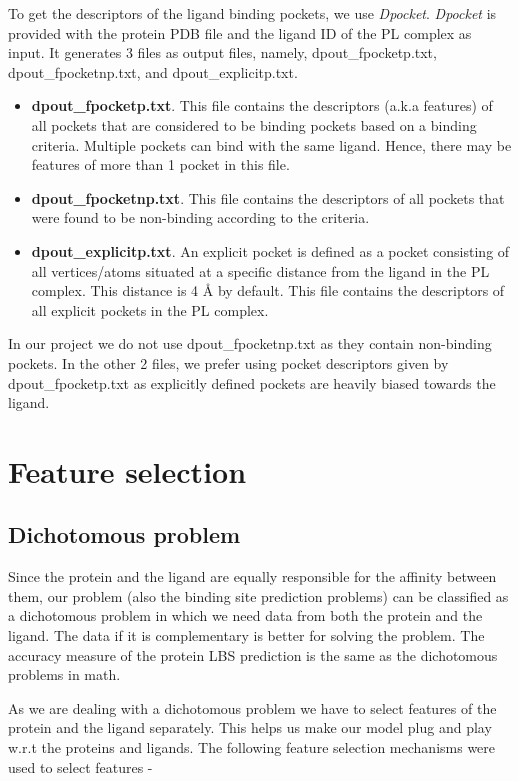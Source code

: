 \documentclass[11pt]{article}
\begin{document}
To get the descriptors of the ligand binding pockets,  we use \textit{Dpocket}.
\textit{Dpocket} is provided with the protein PDB file and the ligand ID of the PL complex as input.
It generates 3 files as output files,  namely,  dpout\_fpocketp.txt, dpout\_fpocketnp.txt,  and  dpout\_explicitp.txt.
\begin{itemize}
\item \textbf{dpout\_fpocketp.txt}.
This file contains the descriptors (a.k.a features) of all pockets that are considered to be binding pockets based on a binding criteria.
Multiple pockets can bind with the same ligand.
Hence,  there may be features of more than 1 pocket in this file.
\item \textbf{dpout\_fpocketnp.txt}.  This file contains the descriptors of all pockets that were found to be non-binding according to the criteria.
\item \textbf{dpout\_explicitp.txt}.  An explicit pocket is defined as a pocket consisting of all vertices/atoms situated at a specific distance from the ligand in the PL complex.
This distance is 4 \r{A} by default.
This file contains the descriptors of all explicit pockets in the PL complex. 
\end{itemize}

In our project we do not use dpout\_fpocketnp.txt as they contain non-binding pockets.
In the other 2 files,  we prefer using pocket descriptors given by dpout\_fpocketp.txt as explicitly defined pockets are heavily biased towards the ligand.

\section{Feature selection}

\subsection{Dichotomous problem}
Since the protein and the ligand are equally responsible for the affinity between them, our problem (also the binding site prediction problems) can be classified as a dichotomous problem in which we need data from both
the protein and the ligand.
The data if it is complementary is better for solving the problem.
The accuracy measure of the protein LBS prediction is the same as the dichotomous problems in math.

As we are dealing with a dichotomous problem we have to select features of the protein and the ligand separately.
This helps us make our model plug and play w.r.t the proteins and ligands.
The following feature selection mechanisms were used to select features -
\end{document}
